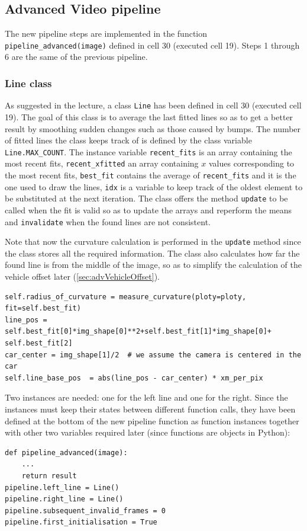 \documentclass{article}
\let\cd\lstinline
\begin{document}
\subsection{Advanced Video pipeline}
The new pipeline steps are implemented in the function \cd+pipeline_advanced(image)+ defined in cell 30 (executed cell 19). Steps 1 through 6 are the same of the previous pipeline.

\subsubsection{Line class}
As suggested in the lecture, a class \cd+Line+ has been defined in cell 30 (executed cell 19). The goal of this class is to average the last fitted lines so as to get a better result by smoothing sudden changes such as those caused by bumps. The number of fitted lines the class keeps track of is defined by the class variable \cd+Line.MAX_COUNT+. The instance variable \cd+recent_fits+ is an array containing the most recent fits, \cd+recent_xfitted+ an array containing $x$ values corresponding to the most recent fits, \cd+best_fit+ contains the average of \cd+recent_fits+ and it is the one used to draw the lines, \cd+idx+ is a variable to keep track of the oldest element to be substituted at the next iteration. The class offers the method \cd+update+ to be called when the fit is valid so as to update the arrays and reperform the means and \cd+invalidate+ when the found lines are not consistent.

Note that now the curvature calculation is performed in the \cd+update+ method since the class stores all the required information. The class also calculates how far the found line is from the middle of the image, so as to simplify the calculation of the vehicle offset later (\autoref{sec:advVehicleOffset}).
\begin{lstlisting}
self.radius_of_curvature = measure_curvature(ploty=ploty, fit=self.best_fit)
line_pos = self.best_fit[0]*img_shape[0]**2+self.best_fit[1]*img_shape[0]+ self.best_fit[2] 
car_center = img_shape[1]/2  # we assume the camera is centered in the car
self.line_base_pos  = abs(line_pos - car_center) * xm_per_pix
\end{lstlisting}

Two instances are needed: one for the left line and one for the right. Since the instances must keep their states between different function calls, they have been defined at the bottom of the new pipeline function as function instances together with other two variables required later (since functions are objects in Python):
\begin{lstlisting}
def pipeline_advanced(image):
    ...
    return result
pipeline.left_line = Line()
pipeline.right_line = Line()
pipeline.subsequent_invalid_frames = 0   
pipeline.first_initialisation = True
\end{lstlisting}
\end{document}
